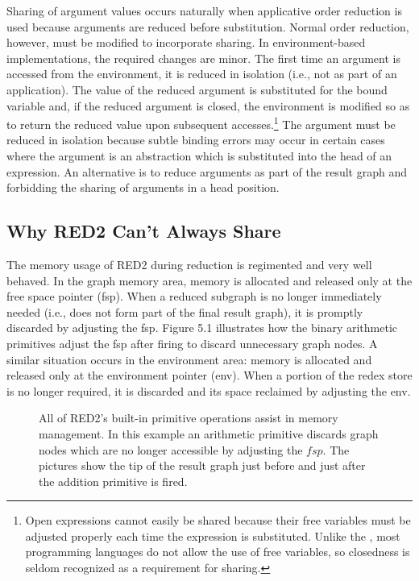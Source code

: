 Sharing of argument values occurs naturally when applicative order reduction is
used because arguments are reduced before substitution. Normal order reduction,
however, must be modified to incorporate sharing. In environment-based
implementations, the required changes are minor. The first time an argument is
accessed from the environment, it is reduced in isolation (i.e., not as part of
an application). The value of the reduced argument is substituted for the bound
variable and, if the reduced argument is closed, the environment is modified so
as to return the reduced value upon subsequent
accesses.\footnote{Open expressions cannot easily be shared because their free
variables must be adjusted properly each time the expression is substituted.
Unlike the \lambdacalculus{}, most programming languages do not allow the use
of free variables, so closedness is seldom recognized as a requirement for
sharing.} The argument must be reduced in isolation because subtle binding
errors may occur in certain cases where the argument is an abstraction which is
substituted into the head of an expression. An alternative is to reduce
arguments as part of the result graph and forbidding the sharing of arguments in
a head position.

\subsection{Why RED2 Can't Always Share}

The memory usage of RED2 during reduction is regimented and very well behaved.
In the graph memory area, memory is allocated and released only at the free
space pointer (fsp). When a reduced subgraph is no longer immediately needed
(i.e., does not form part of the final result graph), it is promptly discarded
by adjusting the fsp. Figure 5.1 illustrates how the binary arithmetic
primitives adjust the fsp after firing to discard unnecessary graph nodes. A
similar situation occurs in the environment area: memory is allocated and
released only at the environment pointer (env). When a portion of the redex
store is no longer required, it is discarded and its space reclaimed by
adjusting the env.

\begin{figure}[htbp]
\centering

\caption[Incremental memory management]{All of RED2's built-in primitive operations assist in memory
management. In this example an arithmetic primitive discards graph nodes which
are no longer accessible by adjusting the \(fsp\). The pictures show the tip of
the result graph just before and just after the addition primitive is fired.}
\end{figure}

